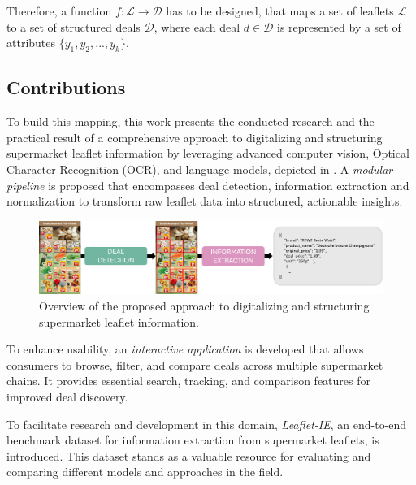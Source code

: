 \documentclass[11pt]{article}
\begin{document}
Therefore, a function $f: \mathcal{L} \to \mathcal{D}$ has to be designed, that maps a set of leaflets $\mathcal{L}$ to a set of structured deals $\mathcal{D}$, where each deal $d \in \mathcal{D}$ is represented by a set of attributes $\{y_1, y_2, ..., y_k\}$.


\subsection{Contributions}
To build this mapping, this work presents the conducted research and the practical result of a comprehensive approach to digitalizing and structuring supermarket leaflet information by leveraging advanced computer vision, Optical Character Recognition (OCR), and language models, depicted in . A \emph{modular pipeline} is proposed that encompasses deal detection, information extraction and normalization to transform raw leaflet data into structured, actionable insights.

\begin{figure}
    \centering
    \includegraphics[width=0.8\linewidth]{figures/overview.png}
    \caption{Overview of the proposed approach to digitalizing and structuring supermarket leaflet information.}
    \label{fig:overview}
\end{figure}

To enhance usability, an \emph{interactive application} is developed that allows consumers to browse, filter, and compare deals across multiple supermarket chains. It provides essential search, tracking, and comparison features for improved deal discovery.

To facilitate research and development in this domain, \emph{Leaflet-IE}, an end-to-end benchmark dataset for information extraction from supermarket leaflets, is introduced. This dataset stands as a valuable resource for evaluating and comparing different models and approaches in the field.
\end{document}
